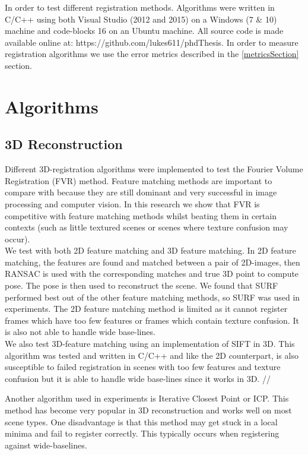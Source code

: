 In order to test different registration methods. Algorithms were written in C/C++ using both Visual Studio (2012 and 2015) on a Windows (7 \& 10) machine and code-blocks 16 on an Ubuntu machine. All source code is made available online at: https://github.com/lukes611/phdThesis. In order to measure registration algorithms we use the error metrics described in the \ref{metricsSection} section.  

\section{Algorithms}
\label{AlgorithmsSection}

\subsection{3D Reconstruction}

Different 3D-registration algorithms were implemented to test the Fourier Volume Registration (FVR) method. Feature matching methods are important to compare with because they are still dominant and very successful in image processing and computer vision. In this research we show that FVR is competitive with feature matching methods whilst beating them in certain contexts (such as little textured scenes or scenes where texture confusion may occur). \\ 

We test with both 2D feature matching and 3D feature matching. In 2D feature matching, the features are found and matched between a pair of 2D-images, then RANSAC is used with the corresponding matches and true 3D point to compute pose. The pose is then used to reconstruct the scene. We found that SURF performed best out of the other feature matching methods, so SURF was used in experiments. The 2D feature matching method is limited as it cannot register frames which have too few features or frames which contain texture confusion. It is also not able to handle wide base-lines. \\

We also test 3D-feature matching using an implementation of SIFT in 3D. This algorithm was tested and written in C/C++ and like the 2D counterpart, is also susceptible to failed registration in scenes with too few features and texture confusion but it is able to handle wide base-lines since it works in 3D. //

Another algorithm used in experiments is Iterative Closest Point or ICP. This method has become very popular in 3D reconstruction and works well on most scene types. One disadvantage is that this method may get stuck in a local minima and fail to register correctly. This typically occurs when registering against wide-baselines. \\


